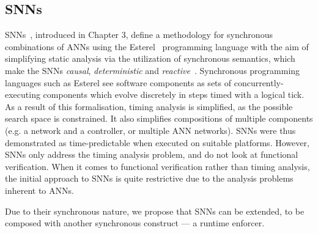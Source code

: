 \subsection{\acfp{SNN}}

\acp{SNN}~\cite{sann}, introduced in Chapter 3, define a methodology for synchronous combinations of \acp{ANN} using the Esterel~\cite{berry2000foundations} programming language with the aim of simplifying static analysis via the utilization of synchronous semantics, which make the \acp{SNN} \textit{causal}, \textit{deterministic} and \textit{reactive}~\cite{benveniste2003synchronous}. 
Synchronous programming languages such as Esterel see software components as sets of concurrently-executing components which evolve discretely in steps timed with a logical tick.
As a result of this formalisation, timing analysis is simplified, as the possible search space is constrained.
It also simplifies compositions of multiple components (e.g. a network and a controller, or multiple \ac{ANN} networks).
\acp{SNN} were thus demonstrated as time-predictable when executed on suitable platforms.
However, \acp{SNN} only address the timing analysis problem, and do not look at functional verification.
When it comes to functional verification rather than timing analysis, the initial approach to \acp{SNN} is quite restrictive due to the analysis problems inherent to \acp{ANN}. 


Due to their synchronous nature, we propose that \acp{SNN} can be extended, to be composed with another synchronous construct --- a runtime enforcer.




